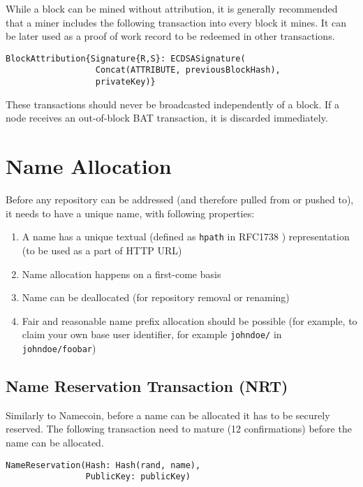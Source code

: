 \documentclass[a4paper]{article}
\begin{document}
While a block can be mined without attribution, it is generally recommended that a miner includes the following transaction into every block it mines. It can be later used as a proof of work record to be redeemed in other transactions.

\begin{verbatim}
BlockAttribution{Signature{R,S}: ECDSASignature(
                  Concat(ATTRIBUTE, previousBlockHash),
                  privateKey)}
\end{verbatim}

These transactions should never be broadcasted independently of a block. If a node receives an out-of-block BAT transaction, it is discarded immediately.

\section{Name Allocation}

Before any repository can be addressed (and therefore pulled from or pushed to), it needs to have a unique name, with following properties:

\begin{enumerate}
\item A name has a unique textual (defined as \texttt{hpath} in RFC1738 \cite{rfc1738}) representation (to be used as a part of HTTP URL)
\item Name allocation happens on a first-come basis
\item Name can be deallocated (for repository removal or renaming)
\item Fair and reasonable name prefix allocation should be possible (for example, to claim your own base user identifier, for example \texttt{johndoe/} in \texttt{johndoe/foobar})
\end{enumerate}

\subsection{Name Reservation Transaction (NRT)}

Similarly to Namecoin, before a name can be allocated it has to be securely reserved. The following transaction need to mature (12 confirmations) before the name can be allocated.


\begin{verbatim}
NameReservation(Hash: Hash(rand, name),
                PublicKey: publicKey)
\end{verbatim}
\end{document}
